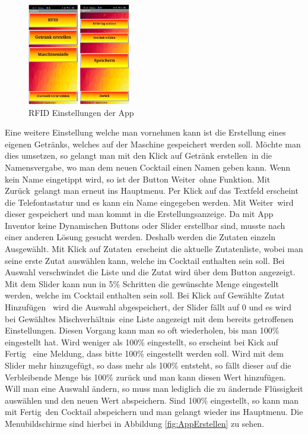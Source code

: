 \begin{figure}[h!]
	\centering
	\includegraphics[width=0.4\textwidth]{graphics/AppRFID}
	\caption{RFID Einstellungen der App}
	\label{fig:AppRFID}
\end{figure}

Eine weitere Einstellung welche man vornehmen kann ist die Erstellung eines eigenen Getränks, welches auf der Maschine gespeichert werden soll. Möchte man dies umsetzen, so gelangt man mit den Klick auf \flqq Getränk erstellen\frqq~in die Namensvergabe, wo man dem neuen Cocktail einen Namen geben kann. Wenn kein Name eingetippt wird, so ist der Button \flqq Weiter\frqq~ohne Funktion. Mit \flqq Zurück\frqq~gelangt man erneut ins Hauptmenu. Per Klick auf das Textfeld erscheint die Telefontastatur und es kann ein Name eingegeben werden. Mit \flqq Weiter\frqq~wird dieser gespeichert und man kommt in die Erstellungsanzeige. Da mit App Inventor keine Dynamischen Buttons oder Slider erstellbar sind, musste nach einer anderen Lösung gesucht werden. Deshalb werden die Zutaten einzeln Ausgewählt. Mit Klick auf \flqq Zutaten\frqq~erscheint die aktuelle Zutatenliste, wobei man seine erste Zutat auswählen kann, welche im Cocktail enthalten sein soll. Bei Auswahl verschwindet die Liste und die Zutat wird über dem Button angezeigt. Mit dem Slider kann nun in 5\% Schritten die gewünschte Menge eingestellt werden, welche im Cocktail enthalten sein soll. Bei Klick auf \flqq Gewählte Zutat Hinzufügen\frqq~ wird die Auswahl abgespeichert, der Slider fällt auf 0 und es wird bei \flqq Gewähltes Mischverhältnis\frqq~eine Liste angezeigt mit dem bereits getroffenen Einstellungen. Diesen Vorgang kann man so oft wiederholen, bis man 100\% eingestellt hat. Wird weniger als 100\% eingestellt, so erscheint bei Kick auf \flqq Fertig\frqq~ eine Meldung, dass bitte 100\% eingestellt werden soll. Wird mit dem Slider mehr hinzugefügt, so dass mehr als 100\% entsteht, so fällt dieser auf die Verbleibende Menge bis 100\% zurück und man kann diesen Wert hinzufügen. Will man eine Auswahl ändern, so muss man lediglich die zu ändernde Flüssigkeit auswählen und den neuen Wert abspeichern. Sind 100\% eingestellt, so kann man mit \flqq Fertig\frqq~den Cocktail abspeichern und man gelangt wieder ins Hauptmenu. Die Menubildschirme sind hierbei in Abbildung \ref{fig:AppErstellen} zu sehen.\\

